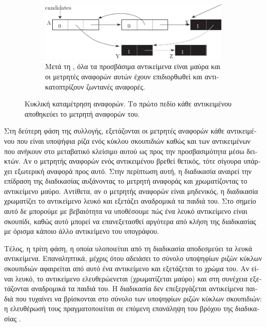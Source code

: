 \begin{greek}
\begin{figure}[H]
  \begin{subfigure}[b]{1.0\textwidth}
    \includegraphics{figures/refcnt_2c}
    \caption
      {Μετά τη , όλα τα προσβάσιμα αντικείμενα
       είναι μαύρα και οι μετρητές αναφορών αυτών έχουν
       επιδιορθωθεί και αντικατοπτρίζουν ζωντανές αναφορές.}
  \end{subfigure}
  \caption[Κυκλική καταμέτρηση αναφορών.]
    {Κυκλική καταμέτρηση αναφορών. Το πρώτο πεδίο κάθε
     αντικειμένου αποθηκεύει το μετρητή αναφορών του.}
  \label{fig:refcnt_2}
\end{figure}

Στη δεύτερη φάση της συλλογής, εξετάζονται οι μετρητές
αναφορών κάθε αντικειμένου που είναι υποψήφια ρίζα ενός
κύκλου σκουπιδιών καθώς και των αντικειμένων που ανήκουν
στο μεταβατικό κλείσιμο αυτού ως προς την προσβασιμότητα
μέσω δεικτών. Αν ο μετρητής αναφορών ενός αντικειμένου
βρεθεί θετικός, τότε σίγουρα υπάρχει εξωτερική αναφορά
προς αυτό. Στην περίπτωση αυτή, η διαδικασία
 αναιρεί την επίδραση της διαδικασίας
 αυξάνοντας το μετρητή αναφοράς και
χρωματίζοντας το αντικείμενο μαύρο. Αντίθετα, αν ο μετρητής
αναφορών είναι μηδενικός, η διαδικασία 
χρωματίζει το αντικείμενο λευκό και εξετάζει αναδρομικά τα
παιδιά του. Στο σημείο αυτό δε μπορούμε με βεβαιότητα να
υποθέσουμε πώς ένα λευκό αντικείμενο είναι σκουπίδι, καθώς
αυτό μπορεί να επανεξετασθεί αργότερα από κλήση της
διαδικασίας  με όρισμα κάποιο άλλο
αντικείμενο του υπογράφου.

Τέλος, η τρίτη φάση, η οποία υλοποιείται από τη διαδικασία
 αποδεσμεύει τα λευκά αντικείμενα.
Επαναληπτικά, μέχρις ότου αδειάσει το σύνολο υποψηφίων ριζών
κύκλων σκουπιδιών αφαιρείται από αυτό ένα αντικείμενο και
εξετάζεται το χρώμα του. Αν είναι λευκό, το αντικείμενο
ελευθερώενεται (χρωματίζεται μαύρο) και στη συνέχεια
εξετάζονται αναδρομικά τα παιδιά του. Η διαδικασία
 δεν επεξεργάζεται αντικείμενα
παιδιά που τυχαίνει να βρίσκονται στο σύνολο των υποψηφίων
ριζών κύκλων σκουπιδιών: η ελευθέρωσή τους πραγματοποιείται
σε επόμενη επανάληψη του βρόχου της διαδικασίας
.


\end{greek}
